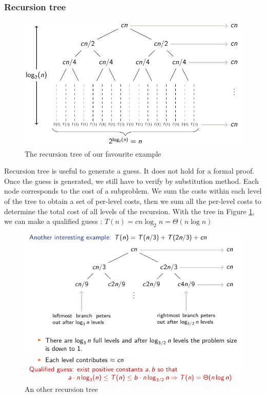 \documentclass[12pt,twoside,a4paper]{article}
\begin{document}
\subsubsection{Recursion tree}
\begin{figure}
	\centering
	\includegraphics[scale=0.5]{images/recursion_Tree}
	\captionsetup{justification=centering}
	\caption{The recursion tree of our favourite example}
	\label{fig: recursion tree}
\end{figure}
Recursion tree is useful to generate a guess. It does not hold for a formal proof. Once the guess is generated, we still have to verify by substitution method. Each node corresponds to the cost of a subproblem. We sum the costs within each level of the tree to obtain a set of per-level costs, then we sum all the per-level costs to determine the total cost of all levels of the recursion. With the tree in Figure \ref{fig: recursion tree}, we can make a qualified guess : $T(n) = cn\log_2n = \Theta(n \log n)$
\begin{figure}[h]
	\centering
	\includegraphics[scale=0.7]{images/interesting_example_recursion_tree}
	\caption{An other recursion tree}
	\label{fig: interesting example recursion tree}
\end{figure}
~
\end{document}
